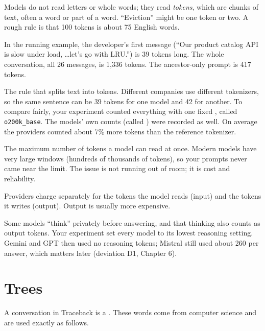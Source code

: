  Models do not read letters or whole words; they read \emph{tokens}, which are chunks of text, often a word or part of a word. ``Eviction'' might be one token or two. A rough rule is that 100 tokens is about 75 English words.

\begin{example}
In the running example, the developer's first message (``Our product catalog API is slow under load, \dots let's go with LRU.'') is 39 tokens long. The whole conversation, all 26 messages, is 1,336 tokens. The ancestor-only prompt is 417 tokens.
\end{example}

 The rule that splits text into tokens. Different companies use different tokenizers, so the same sentence can be 39 tokens for one model and 42 for another. To compare fairly, your experiment counted everything with one fixed , called \texttt{o200k\_base}. The models' own counts (called ) were recorded as well. On average the providers counted about 7\% more tokens than the reference tokenizer.

 The maximum number of tokens a model can read at once. Modern models have very large windows (hundreds of thousands of tokens), so your prompts never came near the limit. The issue is not running out of room; it is cost and reliability.

 Providers charge separately for the tokens the model reads (input) and the tokens it writes (output). Output is usually more expensive.

 Some models ``think'' privately before answering, and that thinking also counts as output tokens. Your experiment set every model to its lowest reasoning setting. Gemini and GPT then used no reasoning tokens; Mistral still used about 260 per answer, which matters later (deviation D1, Chapter 6).

\section{Trees}

A conversation in Traceback is a . These words come from computer science and are used exactly as follows.

